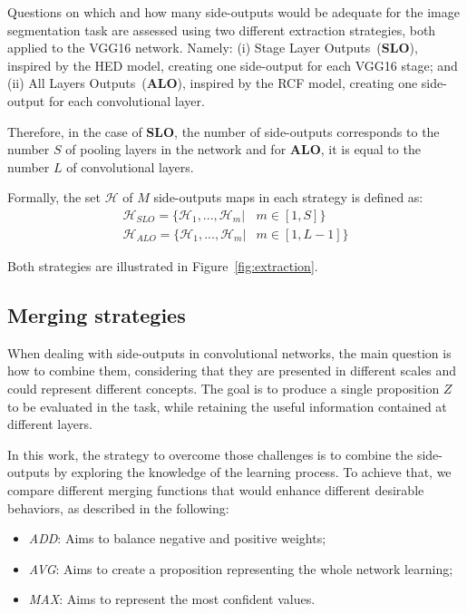 Questions on which and how many side-outputs would be adequate for the image segmentation task are assessed using two different extraction strategies, both applied to the VGG16 network. Namely: (i) Stage Layer Outputs~(\textbf{SLO}), inspired by the HED model, creating one side-output for each VGG16 stage; and (ii) All Layers Outputs~(\textbf{ALO}), inspired by the RCF model, creating one side-output for each convolutional layer. 

Therefore, in the case of \textbf{SLO}, the number of side-outputs corresponds to the number $S$ of pooling layers in the network and for \textbf{ALO}, it is equal to the number $L$ of convolutional layers.

Formally, the set $\mathcal{H}$ of $M$ side-outputs maps in each strategy is defined as:
\small
\begin{align}
\mathcal{H}_{SLO}=\{\mathcal{H}_1,...,\mathcal{H}_m|& m\in[1,S]\}\\
\mathcal{H}_{ALO}=\{\mathcal{H}_1,...,\mathcal{H}_m|& m\in[1,L-1]\}
\end{align}
\normalsize


Both strategies are illustrated in Figure~\ref{fig:extraction}.



\subsection{Merging strategies}
\label{ssec:mergin_strategies}

When dealing with side-outputs in convolutional networks, the main question is how to combine them, considering that they are presented in different scales and could represent different concepts. The goal is to produce a single proposition $Z$ to be evaluated in the task, while retaining the useful information contained at different layers.

In this work, the strategy to overcome those challenges is to combine the side-outputs by exploring the knowledge of the learning process. To achieve that, we compare different merging functions that would enhance different desirable behaviors, as described in the following: 
\begin{itemize}
\item \textit{ADD}: Aims to balance negative and positive weights;
\item \textit{AVG}: Aims to create a proposition representing the whole network learning;  
\item \textit{MAX}: Aims to represent the most confident values. 
\end{itemize}  

